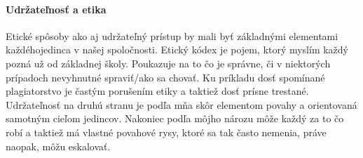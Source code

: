 \documentclass[10pt,twoside,slovak,a4paper]{article}
\begin{document}
\paragraph{Udržateľnosť a etika}
Etické spôsoby ako aj udržateľný prístup by mali byť základnými elementami každéhojedinca v našej spoločnosti. Etický kódex je pojem, ktorý myslím každý pozná už od základnej školy. Poukazuje na to čo je správne, či v niektorých prípadoch nevyhnutné spraviť/ako sa chovať. Ku príkladu dosť spomínané plagiatorstvo je častým porušením etiky a taktiež dosť prísne trestané. Udržateľnosť na druhú stranu je podľa mňa skôr elementom povahy a orientovaná samotným cieľom jedincov. Nakoniec podľa môjho nározu môže každý za to čo robí a taktiež má vlastné povahové rysy, ktoré sa tak často nemenia, práve naopak, môžu eskalovať.











\nocite{*}		%

\end{document}
